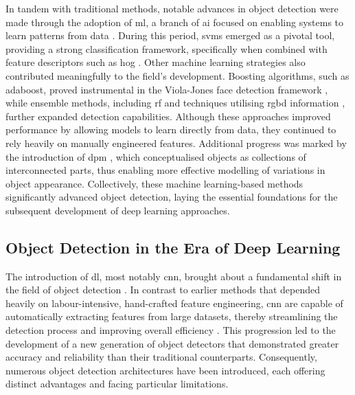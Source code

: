 In tandem with traditional methods, notable advances in object detection were made through the adoption of \gls{ml}, a branch of \gls{ai} focused on enabling systems to learn patterns from data \cite{machine_learning}. During this period, \gls{svms} \cite{hearst1998support} emerged as a pivotal tool, providing a strong classification framework, specifically when combined with feature descriptors such as \gls{hog} \cite{bhatt2023state}. Other machine learning strategies also contributed meaningfully to the field's development. Boosting algorithms, such as \gls{adaboost}, proved instrumental in the Viola-Jones face detection framework \cite{viola2001rapid}, while ensemble methods, including \gls{rf} \cite{saffari2009line} and techniques utilising \gls{rgbd} information \cite{seychell16}, further expanded detection capabilities. Although these approaches improved performance by allowing models to learn directly from data, they continued to rely heavily on manually engineered features. Additional progress was marked by the introduction of \gls{dpm} \cite{felzenszwalb2009object}, which conceptualised objects as collections of interconnected parts, thus enabling more effective modelling of variations in object appearance. Collectively, these machine learning-based methods significantly advanced object detection, laying the essential foundations for the subsequent development of deep learning approaches.

\subsection{Object Detection in the Era of Deep Learning}
\label{subsec:2_detection_in_dl}

The introduction of \gls{dl}, most notably \gls{cnn}, brought about a fundamental shift in the field of object detection \cite{cnn_survey}. In contrast to earlier methods that depended heavily on labour-intensive, hand-crafted feature engineering, \gls{cnn} are capable of automatically extracting features from large datasets, thereby streamlining the detection process and improving overall efficiency \cite{feature_learning, deep_learning_review, cnns}. This progression led to the development of a new generation of object detectors that demonstrated greater accuracy and reliability than their traditional counterparts. Consequently, numerous object detection architectures have been introduced, each offering distinct advantages and facing particular limitations.

